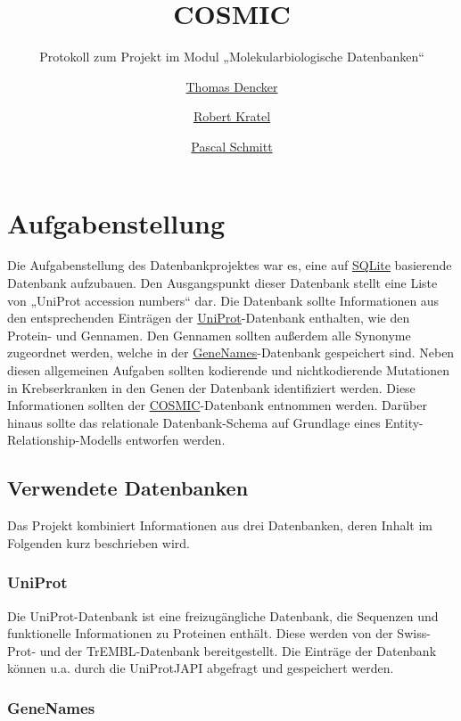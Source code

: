 \documentclass{scrartcl}
\title{COSMIC}
\subtitle{Protokoll zum Projekt im Modul „Molekularbiologische Datenbanken“}
\author{%
	\href{mailto:thomas.dencker@stud.uni-goettingen.de}{Thomas Dencker} \and
	\href{mailto:robert.kratel@stud.uni-goettingen.de}{Robert Kratel} \and
	\href{pascal.schmitt1@stud.uni-goettingen.de}{Pascal Schmitt}}
\begin{document}
\maketitle{}
\vfill
\tableofcontents
\newpage

\section{Aufgabenstellung}

Die Aufgabenstellung des Datenbankprojektes war es, eine auf \href{http://sqlite.org/}{SQLite} basierende Datenbank aufzubauen. Den Ausgangspunkt dieser Datenbank stellt eine Liste von „UniProt accession numbers“ dar. Die Datenbank sollte Informationen aus den entsprechenden Einträgen der \href{http://uniprot.org/}{UniProt}-Datenbank enthalten, wie den Protein- und Gennamen. Den Gennamen sollten außerdem alle Synonyme zugeordnet werden, welche in der \href{http://genenames.org/}{GeneNames}-Datenbank gespeichert sind.
   Neben diesen allgemeinen Aufgaben sollten kodierende und nichtkodierende Mutationen in Krebserkranken in den Genen der Datenbank identifiziert werden. Diese Informationen sollten der \href{http://cancer.sanger.ac.uk/cancergenome/projects/studies/}{COSMIC}-Datenbank entnommen werden.
   Darüber hinaus sollte das relationale Datenbank-Schema auf Grundlage eines Entity-Relationship-Modells entworfen werden.

\subsection{Verwendete Datenbanken}

Das Projekt kombiniert Informationen aus drei Datenbanken, deren Inhalt im Folgenden kurz beschrieben wird.

\subsubsection{UniProt}

Die UniProt-Datenbank ist eine freizugängliche Datenbank, die Sequenzen und funktionelle Informationen zu Proteinen enthält. Diese werden von der Swiss-Prot- und der TrEMBL-Datenbank bereitgestellt. Die Einträge der Datenbank können u.a. durch die UniProtJAPI abgefragt und gespeichert werden.

\subsubsection{GeneNames}
\end{document}
